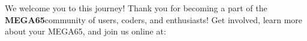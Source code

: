 We welcome you to this journey! Thank you for becoming a part of the {\bf MEGA65}community of users, coders, and enthusiasts! Get involved, learn more about your MEGA65, and join us online at:

